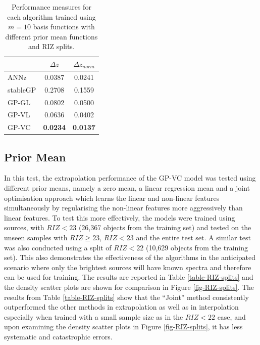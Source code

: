 \documentclass[useAMS,usenatbib,fleqn]{mn2e}
\begin{document}
 \begin{table}
\caption{Performance measures for each algorithm trained using $m=10$ basis functions with different prior mean functions and RIZ splits.}
\begin{center}
  \begin{tabular}{| l | c | c | }
     				&	$\Delta z$	&	$\Delta z_{norm}$	\\	\hline
	ANNz		&	0.0387			&	0.0241				\\
	stableGP		&	0.2708			&	0.1559				\\
	GP-GL		&	0.0802			&	0.0500				\\
	GP-VL		&	0.0636			&	0.0402				\\
	GP-VC		&	\textbf{0.0234}		&	\textbf{0.0137}			\\	\hline
  \end{tabular}
  \label{table-experiment-1}
\end{center}
\end{table}

\subsection{Prior Mean}

In this test, the extrapolation performance of the GP-VC model was tested using different prior means, namely a zero mean, a linear regression mean and a joint optimisation approach which learns the linear and non-linear features simultaneously by regularising the non-linear features more aggressively than linear features. To test this more effectively,  the models were trained using sources, with $RIZ<23$ (26,367 objects from the training set) and tested on the unseen samples with $RIZ\ge23$, $RIZ<23$ and the entire test set. A similar test was also conducted using a split of $RIZ<22$ (10,629 objects  from the training set). This also demonstrates the effectiveness of the algorithms in the anticipated scenario where only the brightest sources will have known spectra and therefore can be used for training. The results are reported in Table \ref{table-RIZ-splits} and the density scatter plots are shown for comparison in Figure \ref{fig-RIZ-splits}. The results from Table \ref{table-RIZ-splits} show that the ``Joint'' method consistently outperformed the other methods in extrapolation as well as in interpolation especially when trained with a small sample size as in the $RIZ<22$ case, and upon examining the density scatter plots in Figure \ref{fig-RIZ-splits}, it has less systematic and catastrophic errors.
\end{document}
